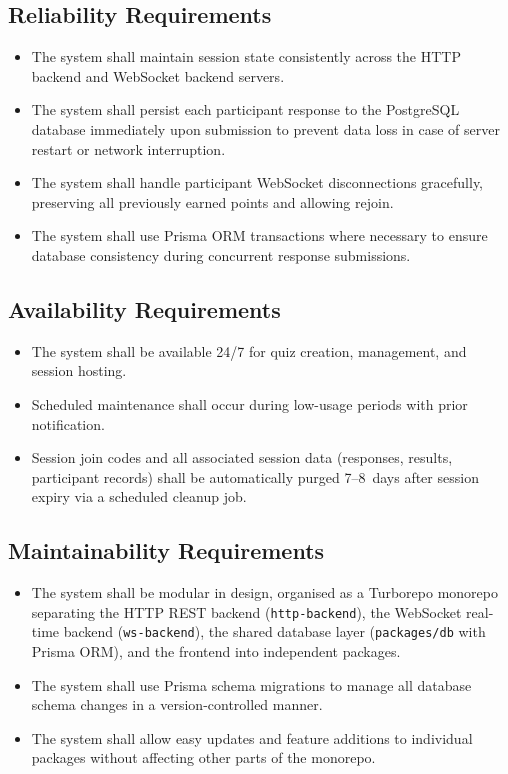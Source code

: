 \documentclass[12pt,a4paper]{article}
\begin{document}
\subsection{Reliability Requirements}
\begin{itemize}
  \item The system shall maintain session state consistently across the HTTP backend
        and WebSocket backend servers.
  \item The system shall persist each participant response to the PostgreSQL database
        immediately upon submission to prevent data loss in case of server restart or
        network interruption.
  \item The system shall handle participant WebSocket disconnections gracefully,
        preserving all previously earned points and allowing rejoin.
  \item The system shall use Prisma ORM transactions where necessary to ensure
        database consistency during concurrent response submissions.
\end{itemize}

\subsection{Availability Requirements}
\begin{itemize}
  \item The system shall be available 24/7 for quiz creation, management, and session
        hosting.
  \item Scheduled maintenance shall occur during low-usage periods with prior
        notification.
  \item Session join codes and all associated session data (responses, results,
        participant records) shall be automatically purged 7--8~days after session
        expiry via a scheduled cleanup job.
\end{itemize}

\subsection{Maintainability Requirements}
\begin{itemize}
  \item The system shall be modular in design, organised as a Turborepo monorepo
        separating the HTTP REST backend (\texttt{http-backend}), the WebSocket
        real-time backend (\texttt{ws-backend}), the shared database layer
        (\texttt{packages/db} with Prisma ORM), and the frontend into independent
        packages.
  \item The system shall use Prisma schema migrations to manage all database schema
        changes in a version-controlled manner.
  \item The system shall allow easy updates and feature additions to individual
        packages without affecting other parts of the monorepo.
\end{itemize}
\end{document}
